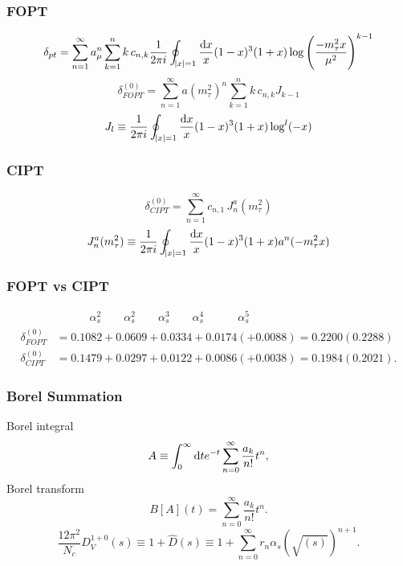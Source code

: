 \documentclass{beamer}
\begin{document}
\begin{frame}
  \frametitle{FOPT}
  \begin{equation}
    \delta_{pt} = \sum_{n=1}^\infty a_\mu^n \sum_{k=1}^n k\, c_{n,k} \frac{1}{2 \pi i} \oint_{\abs{x}=1} \frac{\dif x}{x} (1-x)^3 (1+x) \log \left( \frac{-m_\tau^2 x}{\mu^2} \right)^{k-1}
  \end{equation}
  \begin{equation}
    \delta_{FOPT}^{(0)} = \sum_{n=1}^\infty a(m_\tau^2)^n \sum_{k=1}^n k\, c_{n,k} J_{k-1}
  \end{equation}
  \begin{equation}
    J_l \equiv \frac{1}{2\pi i} \oint_{\abs{x}=1} \frac{\dif x}{x} (1-x)^3 (1+x) \log^l(-x)
  \end{equation}
\end{frame}
\begin{frame}
  \frametitle{CIPT}
  \begin{equation}
    \delta_{CIPT}^{(0)} = \sum_{n=1}^\infty c_{n,1}\, J_n^a(m_\tau^2)
  \end{equation}
  \begin{equation}
    J_n^a(m_\tau^2) \equiv \frac{1}{2 \pi i} \oint_{\abs{x}=1} \frac{\dif x}{x} (1-x)^3 (1+x) a^n (-m_\tau^2 x)
  \end{equation}
\end{frame} 
\begin{frame}
  \frametitle{FOPT vs CIPT}
  \begin{align}
    & \quad\qquad \alpha_s^2 \qquad \alpha_s^2 \qquad \alpha_s^3 \qquad \alpha_s^4 \quad\qquad \alpha_s^5 \nonumber\\
    \delta_{FOPT}^{(0)} &= 0.1082 + 0.0609 + 0.0334 + 0.0174 (+ 0.0088) = 0.2200 (0.2288) \\
    \delta_{CIPT}^{(0)} &= 0.1479 + 0.0297 + 0.0122 + 0.0086 (+ 0.0038) = 0.1984 (0.2021).
  \end{align}
\end{frame}
\begin{frame}
  \frametitle{Borel Summation}
  Borel integral
  \begin{equation}
    A \equiv \int_0^\infty \dif t e^{-t} \sum_{n=0}^\infty \frac{a_k}{n!} t^n,
  \end{equation}
  Borel transform
  \begin{equation}
    B[A](t) = \sum_{n=0}^\infty \frac{a_k}{n!} t^n.
  \end{equation}
  \begin{equation}
    \frac{12 \pi^2}{N_c} D_V^{1+0}(s) \equiv 1 + \widehat D(s) \equiv 1 + \sum_{n=0}^{\infty} r_n \alpha_s(\sqrt{(s)})^{n+1}.
  \end{equation}
\end{frame}
\end{document}
